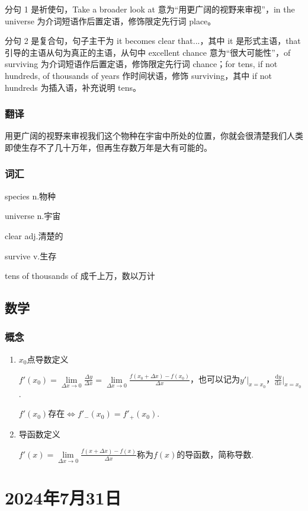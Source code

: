 \documentclass[UTF8]{ctexart}
\begin{document}
分句 1 是祈使句，Take a broader look at 意为“用更广阔的视野来审视”，in the universe 为介词短语作后置定语，修饰限定先行词 place。

分句 2 是复合句，句子主干为 it becomes clear that...，其中 it 是形式主语，that 引导的主语从句为真正的主语，从句中 excellent chance 意为“很大可能性”，of surviving 为介词短语作后置定语，修饰限定先行词 chance；for tens, if not hundreds, of thousands of years 作时间状语，修饰 surviving，其中 if not hundreds 为插入语，补充说明 tens。
\subsubsection{翻译}
用更广阔的视野来审视我们这个物种在宇宙中所处的位置，你就会很清楚我们人类即使生存不了几十万年，但再生存数万年是大有可能的。
\subsubsection{词汇}
\begin{multicols}{2}
      species  n.物种

      universe  n.宇宙

      clear  adj.清楚的

      survive  v.生存

      tens of thousands of 成千上万，数以万计
\end{multicols}
\subsection{数学}
\subsubsection{概念}
\begin{enumerate}
      \item $x_0$点导数定义

            ${f}'(x_0)=\lim\limits_{\Delta x \to 0}\frac{\Delta y}{\Delta x}=\lim\limits_{\Delta x \to 0}\frac{f(x_0+\Delta x)-f(x_0)}{\Delta x}$，也可以记为${y}' |_{x=x_0} $，$\frac{\mathrm{d} y}{\mathrm{d} x} |_{x=x_0}$.

            ${f}'(x_0)$存在$\Leftrightarrow{f}'_-(x_0)={f}'_+(x_0)$.
      \item 导函数定义

            ${f}'(x)=\lim\limits_{\Delta x\to 0}\frac{f(x+\Delta x)-f(x)}{\Delta x}$称为$f(x)$的导函数，简称导数.
\end{enumerate}
\section{2024年7月31日}
\end{document}
